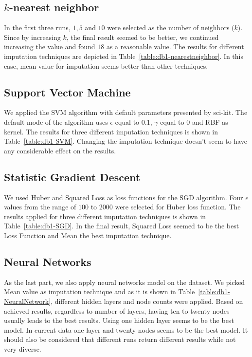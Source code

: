 \subsection{$k$-nearest neighbor}
In the first three runs, $1, 5$ and $10$ were selected as the number of neighbors ($k$). Since by increasing $k$, the final result seemed to be better, we continued increasing the value and found $18$ as a reasonable value. The results for different imputation techniques are depicted in Table~\ref{table:db1-nearestneighbor}. In this case, mean value for imputation seems better than other techniques.

\subsection{Support Vector Machine}
We applied the SVM algorithm with default parameters presented by sci-kit. The default mode of the algorithm uses $\epsilon$ equal to $0.1$, $\gamma$ equal to $0$ and RBF as kernel. The results for three different imputation techniques is shown in Table~\ref{table:db1-SVM}. Changing the imputation technique doesn't seem to have any considerable effect on the results.

\subsection{Statistic Gradient Descent}
We used Huber and Squared Loss as loss functions for the SGD algorithm. Four $\epsilon$ values from the range of $100$ to $2000$ were selected for Huber loss function. The results applied for three different imputation techniques is shown in Table~\ref{table:db1-SGD}. In the final result, Squared Loss seemed to be the best Loss Function and Mean the best imputation technique.

\subsection{Neural Networks}
As the last part, we also apply neural networks model on the dataset. We picked Mean value as imputation technique and as it is shown in Table~\ref{table:db1-NeuralNetwork}, different hidden layers and node counts were applied. Based on achieved results, regardless to number of layers, having ten to twenty nodes usually leads to the best results. Using one hidden layer seems to be the best model. In current data one layer and twenty nodes seems to be the best model. It should also be considered that different runs return different results while not very diverse.

